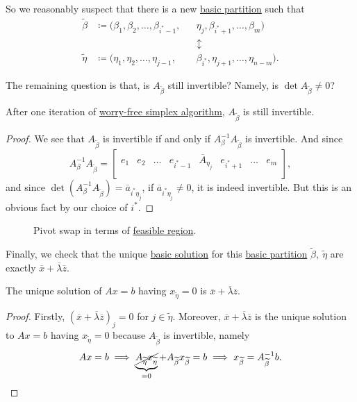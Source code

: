 So we reasonably suspect that there is a new \hyperref[def:basic-partition]{basic partition} such that
\[
	\begin{alignedat}{5}
		\widetilde{\beta} &\coloneqq ( \beta_1, \beta_2, \dots , \beta_{i^{\ast}-1}, &&\eta_{j}, \beta_{i^{\ast}+1}, \dots , \beta_m ) \\
		& &&\updownarrow\\
		\widetilde{\eta} &\coloneqq ( \eta_1, \eta_2, \dots , \eta_{j - 1}, &&\beta_{i^{\ast}}, \eta_{j+1}, \dots , \eta_{n-m} ).
	\end{alignedat}
\]

The remaining question is that, is \(A_{\widetilde{\beta}}\) still invertible? Namely, is \(\det A_{\widetilde{\beta}} \neq 0\)?
\begin{lemma}\label{lma:lec7-3}
	After one iteration of \hyperref[algo:worry-free-simplex-algorithm]{worry-free simplex algorithm}, \(A_{\widetilde{\beta}}\) is still invertible.
\end{lemma}
\begin{proof}
	We see that \(A_{\widetilde{\beta}}\) is invertible if and only if \(A^{-1}_{\beta}A_{\widetilde{\beta}}\) is invertible. And since
	\[
		A^{-1}_{\beta}A_{\widetilde{\beta}} = \begin{bmatrix}
			e_1 & e_2 & \dots & e_{i^{\ast}-1} & \overline{A}_{\eta_{j}} & e_{i^{\ast}+1} & \dots & e_m \\
		\end{bmatrix},
	\]
	and since \(\det(A^{-1}_\beta A_{\widetilde{\beta}}) = \overline{a}_{i^{\ast} \eta_{j}}\), if \(\overline{a}_{i^{\ast} \eta_{j}}\neq 0\), it is indeed invertible. But this is an obvious fact by our choice of \(i^{\ast}\).
\end{proof}

\begin{figure}[H]
	\centering
	\caption{Pivot swap in terms of \hyperref[def:feasible-region]{feasible region}.}
	\label{fig:pivot-swap}
\end{figure}

Finally, we check that the unique \hyperref[def:basic-solution]{basic solution} for this \hyperref[def:basic-partition]{basic partition}
\(\widetilde{\beta},\ \widetilde{\eta}\) are exactly \(\overline{x} + \overline{\lambda}\overline{z}\).
\begin{lemma}\label{lma:lec7-4}
	The unique solution of \(Ax = b\) having \(x_{\widetilde{\eta}} = 0\) is \(\overline{x} + \overline{\lambda}\overline{z}\).
\end{lemma}
\begin{proof}
	Firstly, \((\overline{x} + \overline{\lambda}\overline{z})_j = 0\) for \(j\in \widetilde{\eta}\). Moreover, \(\overline{x} + \overline{\lambda}\overline{z}\) is
	the unique solution to \(Ax = b\) having \(x_{\widetilde{\eta}} = 0\) because \(A_{\widetilde{\beta}}\) is invertible, namely
	\[
		Ax = b \implies \underbrace{\cancel{A_{\widetilde{\eta}}x_{\widetilde{\eta}}}}_{=0} + A_{\widetilde{\beta}}x_{\widetilde{\beta}} = b \implies x_{\widetilde{\beta}} = A^{-1}_{\widetilde{\beta}}b.
	\]
\end{proof}